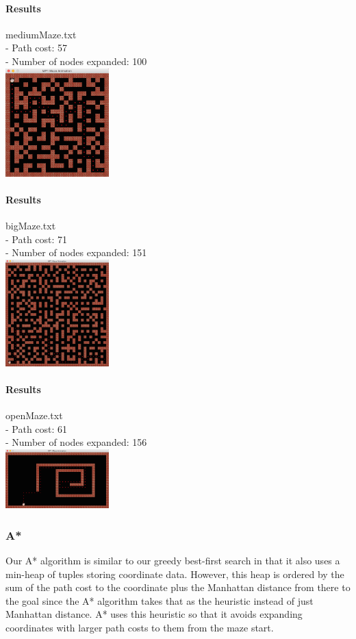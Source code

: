 \begin{multicols*}{2}
\paragraph{Results}
mediumMaze.txt\\
- Path cost: 57\\
- Number of nodes expanded: 100\\
\includegraphics[width=0.3\textwidth]{graphics/mediumMaze_greedy.png}

\paragraph{Results}
bigMaze.txt\\
- Path cost: 71\\
- Number of nodes expanded: 151\\
\includegraphics[width=0.3\textwidth]{graphics/bigMaze_greedy.png}

\paragraph{Results}
openMaze.txt\\
- Path cost: 61\\
- Number of nodes expanded: 156\\
\includegraphics[width=0.3\textwidth]{graphics/openMaze_greedy.png}

\subsubsection*{A*}
Our A* algorithm is similar to our greedy best-first search in that it also uses a min-heap of tuples storing coordinate data. However, this heap is ordered by the sum of the path cost to the coordinate plus the Manhattan distance from there to the goal since the A* algorithm takes that as the heuristic instead of just Manhattan distance. A* uses this heuristic so that it avoids expanding coordinates with larger path costs to them from the maze start.


\end{multicols*}
